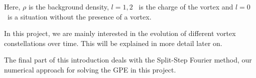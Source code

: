 Here, $\rho$ is the background density, $l = 1, 2$ \ is the charge of the vortex and $l=0$ \ is a situation without the presence of a vortex.

In this project, we are mainly interested in the evolution of different vortex constellations over time. This will be explained in more detail later on.

The final part of this introduction deals with the Split-Step Fourier method, our numerical approach for solving the GPE in this project.